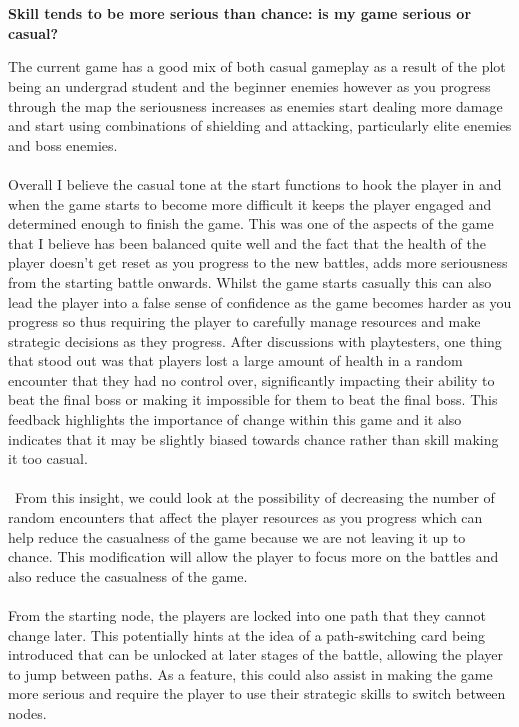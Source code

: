 \documentclass[a4paper]{article}
\begin{document}
\\\\
\begin{center}
\textbf{Skill tends to be more serious than chance: is my game serious or casual?}
\end{center}
\vspace{1.5em} 
The current game has a good mix of both casual gameplay as a result of the plot being an undergrad student and the beginner enemies however as you progress through the map the seriousness increases as enemies start dealing more damage and start using combinations of shielding and attacking, particularly elite enemies and boss enemies. 
\\\\
Overall I believe the casual tone at the start functions to hook the player in and when the game starts to become more difficult it keeps the player engaged and determined enough to finish the game. This was one of the aspects of the game that I believe has been balanced quite well and the fact that the health of the player doesn't get reset as you progress to the new battles, adds more seriousness from the starting battle onwards. Whilst the game starts casually this can also lead the player into a false sense of confidence as the game becomes harder as you progress so thus requiring the player to carefully manage resources and make strategic decisions as they progress. 
\newpage
After discussions with playtesters, one thing that stood out was that players lost a large amount of health in a random encounter that they had no control over, significantly impacting their ability to beat the final boss or making it impossible for them to beat the final boss. This feedback highlights the importance of change within this game and it also indicates that it may be slightly biased towards chance rather than skill making it too casual. 
\\\\\
From this insight, we could look at the possibility of decreasing the number of random encounters that affect the player resources as you progress which can help reduce the casualness of the game because we are not leaving it up to chance. This modification will allow the player to focus more on the battles and also reduce the casualness of the game.
\\\\
From the starting node, the players are locked into one path that they cannot change later. This potentially hints at the idea of a path-switching card being introduced that can be unlocked at later stages of the battle, allowing the player to jump between paths. As a feature, this could also assist in making the game more serious and require the player to use their strategic skills to switch between nodes.
\end{document}
